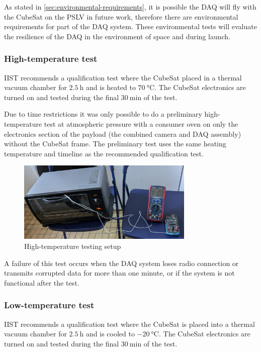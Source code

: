 \documentclass[]{report}
\begin{document}
As stated in \ref{sec:environmental-requirements}, it is possible the DAQ will fly with the CubeSat on the PSLV in future work, therefore there are environmental requirements for part of the DAQ system.
These environmental tests will evaluate the resilience of the DAQ in the environment of space and during launch.

\subsubsection{High-temperature test}
\label{sec:htemp-test-framework}
IIST recommends a qualification test where the CubeSat placed in a thermal vacuum chamber for $\SI{2.5}{\hour}$ and is heated to $\SI{70}{\degreeCelsius}$. The CubeSat electronics are turned on and tested during the final $\SI{30}{\minute}$ of the test.

Due to time restrictions it was only possible to do a preliminary high-temperature test at atmospheric pressure with a consumer oven on only the electronics section of the payload (the combined camera and DAQ assembly) without the CubeSat frame. The preliminary test uses the same heating temperature and timeline as the recommended qualification test.

\begin{figure}[H]
  \centering
  \includegraphics[width=0.75\textwidth]{images/oven_test.jpg}
  \caption{High-temperature testing setup}
  \label{fig:temperature-testing-oven}
\end{figure}

A failure of this test occurs when the DAQ system loses radio connection or transmits corrupted data for more than one minute, or if the system is not functional after the test.

\subsubsection{Low-temperature test}
\label{sec:ltemp-test-framework}
IIST recommends a qualification test where the CubeSat is placed into a thermal vacuum chamber for $\SI{2.5}{\hour}$ and is cooled to $\SI{-20}{\degreeCelsius}$. The CubeSat electronics are turned on and tested during the final $\SI{30}{\minute}$ of the test.
\end{document}
